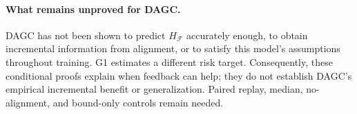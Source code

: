 \documentclass{article}
\begin{document}
\paragraph{What remains unproved for DAGC.}
DAGC has not been shown to predict $H_{\mathcal F}$ accurately enough,
to obtain incremental information from alignment, or to satisfy this model's
assumptions throughout training. G1 estimates a different risk target.
Consequently, these conditional proofs explain when feedback can help;
they do not establish DAGC's empirical incremental benefit or generalization.
Paired replay, median, no-alignment, and bound-only controls remain needed.
\end{document}
